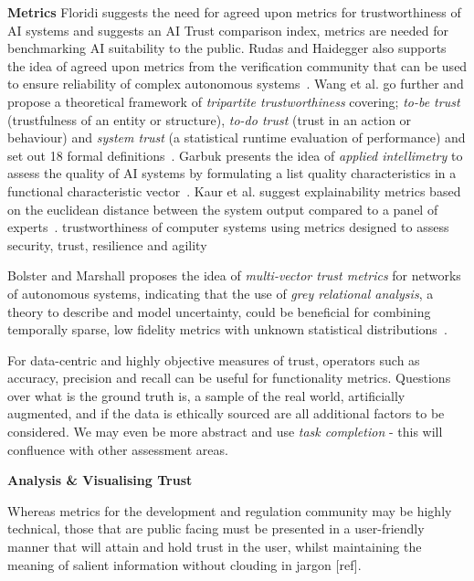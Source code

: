 \noindent\textbf{Metrics}
Floridi suggests the need for agreed upon metrics for trustworthiness of AI systems and suggests an  AI Trust comparison index, metrics are needed for benchmarking AI suitability to the public. 
%
Rudas and Haidegger also supports the idea of agreed upon metrics from the verification community that can be used to ensure reliability of complex autonomous systems~\cite{Rudas2020}. Wang et al. go further and propose a  theoretical framework of \emph{tripartite trustworthiness} covering; \emph{to-be trust} (trustfulness of an entity or structure), \emph{to-do trust} (trust in an action or behaviour) and \emph{system trust} (a statistical runtime evaluation of performance) and set out 18 formal definitions~\cite{Wang2020}. 
%
Garbuk presents the idea of \emph{applied intellimetry} to assess the quality of AI systems by formulating a list quality characteristics in a functional characteristic vector~\cite{garbuk2018intellimetry}. 
%
Kaur et al. suggest explainability metrics based on the euclidean distance between the system output compared to a panel of experts~\cite{kaur2021trustworthy}. 
%
trustworthiness of computer systems using metrics designed to assess security, trust, resilience and agility~\cite{cho2019stram}

Bolster and Marshall proposes the idea of \emph{multi-vector trust metrics} for networks of autonomous systems, indicating that the use of \emph{grey relational analysis}, a theory to describe and model uncertainty, could be beneficial for combining temporally sparse, low fidelity metrics with unknown statistical distributions~\cite{Bolster2014}. 

For data-centric and highly objective measures of trust, operators such as accuracy, precision and recall can be useful for functionality metrics. Questions over what is the ground truth is, a sample of the real world, artificially augmented, and if the data is ethically sourced are all additional factors to be considered. We may even be more abstract and use \emph{task completion} - this will confluence with other assessment areas.



\noindent\textbf{Analysis \& Visualising Trust}

Whereas metrics for the development and regulation community may be highly technical, those that are public facing must be presented in a user-friendly manner that will attain and hold trust in the user, whilst maintaining the meaning of salient information without clouding in jargon [ref]. 

